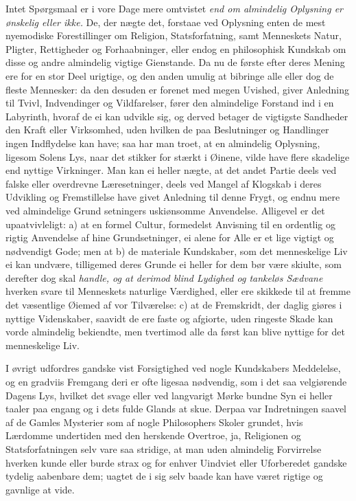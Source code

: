 \documentclass[12pt,a4paper]{article}
\newcommand{\opage}[1]{\marginnote{\footnotesize\textit{[#1]}}}
\begin{document}
Intet Spørgsmaal er i vore Dage mere omtvistet \emph{end om almindelig Oplysning er
ønskelig eller ikke.} De, der nægte det, forstaae ved Oplysning enten de mest nyemodiske
Forestillinger om Religion, Statsforfatning, samt Menneskets Natur, Pligter, Rettigheder
og Forhaabninger, eller endog en philosophisk Kundskab om disse og andre almindelig
vigtige Gienstande. Da nu de første efter deres Mening ere for en stor Deel urigtige, og
den anden umulig at bibringe alle eller dog de fleste Mennesker: da den desuden er forenet
med megen Uvished, giver Anledning til Tvivl, Indvendinger og Vildfarelser, fører den
almindelige Forstand ind i en Labyrinth, hvoraf de ei kan udvikle sig, og derved betager
de vigtigste Sandheder den Kraft eller Virksomhed, uden hvilken de paa Beslutninger og
Handlinger ingen Indflydelse kan have; saa har man troet, at en almindelig Oplysning,
ligesom Solens Lys, naar det stikker for stærkt i Øinene, vilde have flere skadelige end
nyttige Virkninger. Man kan ei heller nægte, at det andet Partie deels ved falske eller
overdrevne Læresetninger, deels ved Mangel af Klogskab i deres Udvikling og Fremstillelse
have givet Anledning til denne Frygt, og endnu mere ved almindelige Grund%
\opage{183}setningers uskiønsomme Anvendelse. Alligevel er det upaatvivleligt: a) at en formel
Cultur, formedelst Anvisning til en ordentlig og rigtig Anvendelse af hine Grundsetninger,
ei alene for Alle er et lige vigtigt og nødvendigt Gode; men at b) de materiale
Kundskaber, som det menneskelige Liv ei kan undvære, tilligemed deres Grunde ei heller for
dem bør være skiulte, som derefter dog skal \emph{handle, og at derimod blind Lydighed og
tankeløs Sædvane} hverken svare til Menneskets naturlige Værdighed, eller ere skikkede til
at fremme det væsentlige Øiemed af vor Tilværelse: c) at de Fremskridt, der daglig giøres
i nyttige Videnskaber, saavidt de ere faste og afgiorte, uden ringeste Skade kan vorde
almindelig bekiendte, men tvertimod alle da først kan blive nyttige for det menneskelige
Liv.

I øvrigt udfordres gandske vist Forsigtighed ved nogle Kundskabers Meddelelse, og en
gradviis Fremgang deri er ofte ligesaa nødvendig, som i det saa velgiørende Dagens Lys,
hvilket det svage eller ved langvarigt Mørke bundne Syn ei heller taaler paa engang og i
dets fulde Glands at skue. Derpaa var Indretningen saavel af de Gamles Mysterier som af
nogle Philosophers Skoler grundet, hvis Lærdomme undertiden med den herskende Overtroe,
ja, Religionen og Statsforfatningen selv vare saa stridige, at man uden almindelig
Forvirrelse hverken kunde eller burde strax og for enhver Uindviet eller Uforberedet
gandske tydelig aabenbare dem;
\opage{184} uagtet de i sig selv baade kan have været rigtige og gavnlige at vide.
\end{document}
